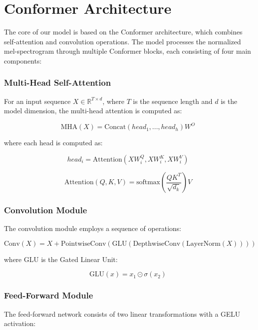 \documentclass[12pt,a4paper]{article}
\begin{document}
\section{Conformer Architecture}
The core of our model is based on the Conformer architecture, which combines self-attention and convolution operations. The model processes the normalized mel-spectrogram through multiple Conformer blocks, each consisting of four main components:

\subsubsection{Multi-Head Self-Attention}
For an input sequence $X \in \mathbb{R}^{T \times d}$, where $T$ is the sequence length and $d$ is the model dimension, the multi-head attention is computed as:

\begin{equation}
    \text{MHA}(X) = \text{Concat}(head_1, ..., head_h)W^O
\end{equation}

where each head is computed as:

\begin{equation}
    head_i = \text{Attention}(XW^Q_i, XW^K_i, XW^V_i)
\end{equation}

\begin{equation}
    \text{Attention}(Q, K, V) = \text{softmax}\left(\frac{QK^T}{\sqrt{d_k}}\right)V
\end{equation}

\subsubsection{Convolution Module}
The convolution module employs a sequence of operations:

\begin{equation}
    \text{Conv}(X) = X + \text{PointwiseConv}(\text{GLU}(\text{DepthwiseConv}(\text{LayerNorm}(X))))
\end{equation}

where GLU is the Gated Linear Unit:

\begin{equation}
    \text{GLU}(x) = x_1 \odot \sigma(x_2)
\end{equation}

\subsubsection{Feed-Forward Module}
The feed-forward network consists of two linear transformations with a GELU activation:
\end{document}
